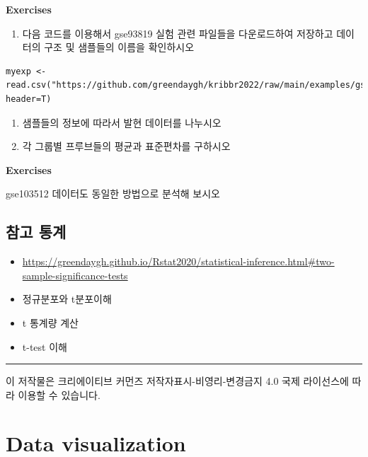 \documentclass[
]{book}
\providecommand{\tightlist}{%
  \setlength{\itemsep}{0pt}\setlength{\parskip}{0pt}}
\begin{document}
\textbf{Exercises}

\begin{enumerate}
\def\labelenumi{\arabic{enumi}.}
\tightlist
\item
  다음 코드를 이용해서 gse93819 실험 관련 파일들을 다운로드하여 저장하고 데이터의 구조 및 샘플들의 이름을 확인하시오
\end{enumerate}

\begin{verbatim}
myexp <- read.csv("https://github.com/greendaygh/kribbr2022/raw/main/examples/gse93819_expression_values.csv", header=T)
\end{verbatim}

\begin{enumerate}
\def\labelenumi{\arabic{enumi}.}
\setcounter{enumi}{1}
\item
  샘플들의 정보에 따라서 발현 데이터를 나누시오
\item
  각 그룹별 프루브들의 평균과 표준편차를 구하시오
\end{enumerate}

\textbf{Exercises}

gse103512 데이터도 동일한 방법으로 분석해 보시오

\hypertarget{uxcc38uxace0-uxd1b5uxacc4}{%
\section{참고 통계}\label{uxcc38uxace0-uxd1b5uxacc4}}

\begin{itemize}
\tightlist
\item
  \url{https://greendaygh.github.io/Rstat2020/statistical-inference.html\#two-sample-significance-tests}
\item
  정규분포와 t분포이해
\item
  t 통계량 계산
\item
  t-test 이해
\end{itemize}

\begin{center}\rule{0.5\linewidth}{0.5pt}\end{center}

이 저작물은 크리에이티브 커먼즈 저작자표시-비영리-변경금지 4.0 국제 라이선스에 따라 이용할 수 있습니다.

\hypertarget{data-visualization}{%
\chapter{Data visualization}\label{data-visualization}}
\end{document}
